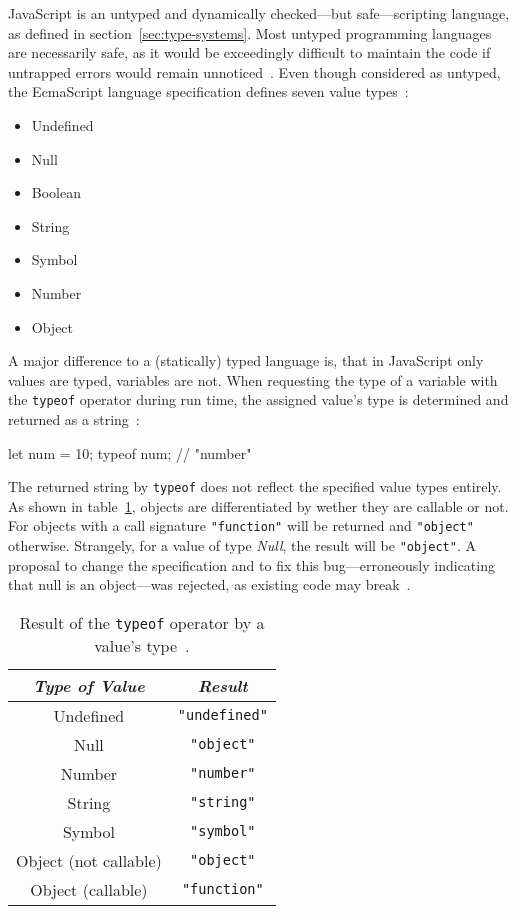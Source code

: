 JavaScript is an untyped and dynamically checked---but safe---scripting language, as defined in section~\ref{sec:type-systems}. Most untyped programming languages are necessarily safe, as it would be exceedingly difficult to maintain the code if untrapped errors would remain unnoticed~\cite[p.~4]{TypeSystems:Cardelli:2004}. Even though considered as untyped, the EcmaScript language specification defines seven value types~\cite[p.~16]{ES6Spec:Ecma:2015}:
\begin{itemize}
  \item Undefined
  \item Null
  \item Boolean
  \item String
  \item Symbol
  \item Number
  \item Object
\end{itemize}
A major difference to a (statically) typed language is, that in JavaScript only values are typed, variables are not. When requesting the type of a variable with the \texttt{typeof} operator during run time, the assigned value's type is determined and returned as a string~\cite[p.~30]{YDKJS:UpAndGoing:Simpson:2015}:
\begin{JsCode}[numbers=none]
let num = 10;
typeof num; // "number"
\end{JsCode}
The returned string by \texttt{typeof} does not reflect the specified value types entirely. As shown in table~\ref{tab:typeof}, objects are differentiated by wether they are callable or not. For objects with a call signature \texttt{"function"} will be returned and \texttt{"object"} otherwise. Strangely, for a value of type \emph{Null}, the result will be \texttt{"object"}. A proposal to change the specification and to fix this bug---erroneously indicating that null is an object---was rejected, as existing code may break~\cite{TypeofNull:Smith:2013, typeof:MDN:2017}.

\begin{table}
\caption{Result of the \texttt{typeof} operator by a value's type~\cite[p.~164]{ES6Spec:Ecma:2015}.}
\label{tab:typeof}
\centering
  \setlength{\tabcolsep}{5mm} %
  \def\arraystretch{1.25} %
  \begin{tabular}{|c|c|}
    \hline
    \emph{Type of Value} & \emph{Result} \\
    \hline \hline
    Undefined & \texttt{"undefined"} \\
    \hline
    Null & \texttt{"object"} \\
    \hline
    Number & \texttt{"number"} \\
    \hline
    String & \texttt{"string"} \\
    \hline
    Symbol & \texttt{"symbol"} \\
    \hline
    Object (not callable) & \texttt{"object"} \\
    \hline
    Object (callable) & \texttt{"function"} \\
    \hline
  \end{tabular}
\end{table}

